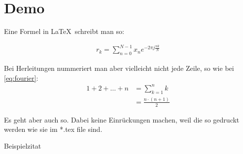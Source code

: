 \section{Demo}
\renewcommand{\pageAuthor}{Clemens Gimpl}
\label{sec:theorie}

Eine Formel in \LaTeX\  schreibt man so:

\begin{align}
	r_k = \sum_{n=0}^{N-1} x_n e^{-2\pi j\frac{nk}{N}}
	\label{eq:fourier}
\end{align}

Bei Herleitungen nummeriert man aber vielleicht nicht jede Zeile, so wie
bei \cref{eq:fourier}:
\begin{align*}
	1 + 2 + \dots + n &= \sum_{k=1}^n k \\
	&= \frac{n \cdot (n+1)}{2}
\end{align*}

Es geht aber auch so. Dabei keine Einrückungen machen, weil die so gedruckt werden wie sie im *.tex file sind.

Beispielzitat \cite{_DINISO924111_}
